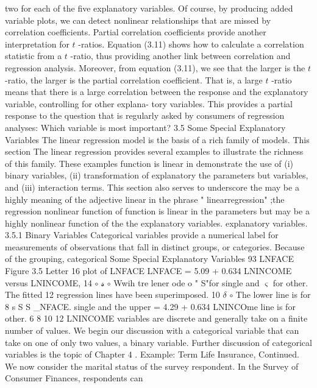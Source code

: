 \documentclass[11pt]{article}
\begin{document}
two for each of the five explanatory variables. Of course, by producing added
variable plots, we can detect nonlinear relationships that are missed by correlation
coefficients.
Partial correlation coefficients provide another interpretation for \(t\) -ratios.
Equation (3.11) shows how to calculate a correlation statistic from a \(t\) -ratio, thus
 providing another link between correlation and regression analysis. Moreover,
from equation (3.11), we see that the larger is the \(t\) -ratio, the larger is the partial
 correlation coefficient. That is, a large \(t\) -ratio means that there is a large correlation
 between the response and the explanatory variable, controlling for other explana-
tory variables. This provides a partial response to the question that is regularly
asked by consumers of regression analyses: Which variable is most important?
 3.5 Some Special Explanatory Variables
The linear regression model is the basis of a rich family of models. This section
The linear regression provides several examples to illustrate the richness of this family. These examples
 function is linear in demonstrate the use of (i) binary variables, (ii) transformation of explanatory
the parameters but variables, and (iii) interaction terms. This section also serves to underscore the
 may be a highly meaning of the adjective linear in the phrase " linearregression" ;the regression
 nonlinear function of function is linear in the parameters but may be a highly nonlinear function of the
the explanatory
variables. explanatory variables.
 3.5.1 Binary Variables
 Categorical variables provide a numerical label for measurements of observations
that fall in distinct groups, or categories. Because of the grouping, categorical
 Some Special Explanatory Variables 93
LNFACE Figure 3.5 Letter
16 plot of LNFACE
LNFACE = 5.09 + 0.634 LNINCOME versus LNINCOME,
14 \(\circ\) \(\mathcal{s}\) \(\circ\) Wwih tre lener ode o
" S"for single and \(\varsigma\)
for other. The fitted
12 regression lines have
been superimposed.
10 \(\delta\) \(\circ\) The lower line is for
8 s S S \_NFACE. single and the upper
= 4.29 + 0.634 LNINCOme line is for other.
6 8 10 12
LNINCOME
variables are discrete and generally take on a finite number of values. We begin
our discussion with a categorical variable that can take on one of only two
values, a binary variable. Further discussion of categorical variables is the topic
 of Chapter \(4\) .
Example: Term Life Insurance, Continued. We now consider the marital status
of the survey respondent. In the Survey of Consumer Finances, respondents can
\end{document}
